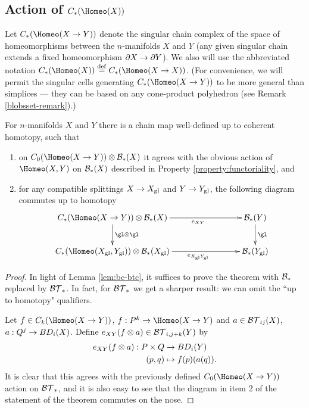 \subsection{Action of \texorpdfstring{$\CH{X}$}{C*(Homeo(M))}}
\label{ss:emap-def}

Let  $C_*(\Homeo(X \to Y))$ denote the singular chain complex of
the space of homeomorphisms
between the $n$-manifolds $X$ and $Y$ 
(any given singular chain extends a fixed homeomorphism $\partial X \to \partial Y$).
We also will use the abbreviated notation $\CH{X} \deq \CH{X \to X}$.
(For convenience, we will permit the singular cells generating $\CH{X \to Y}$ to be more general
than simplices --- they can be based on any cone-product polyhedron (see Remark \ref{blobsset-remark}).)

\begin{thm}  \label{thm:CH} \label{thm:evaluation}%
For $n$-manifolds $X$ and $Y$ there is a chain map
well-defined up to coherent homotopy,
such that
\begin{enumerate}
\item on $C_0(\Homeo(X \to Y)) \otimes \bc_*(X)$ it agrees with the obvious action of 
$\Homeo(X, Y)$ on ${\mathcal B}_*(X)$  described in Property \ref{property:functoriality}, and
\item for any compatible splittings $X\to X_\mathrm{gl}$ and $Y\to Y_\mathrm{gl}$, 
the following diagram commutes up to homotopy
\begin{equation*}
\xymatrix@C+2cm{
      \CH{X \to Y} \otimes \bc_*(X)
        \ar[r]_(.6){e_{XY}}  \ar[d]^{\gl \otimes \gl}   &
            \bc_*(Y)\ar[d]^{\gl} \\
     \CH{X\sgl, Y\sgl} \otimes \bc_*(X\sgl) \ar[r]_(.6){e_{X\sgl Y\sgl}}   & 	\bc_*(Y\sgl)  
}
\end{equation*}
\end{enumerate}
\end{thm}

\begin{proof}
In light of Lemma \ref{lem:bc-btc}, it suffices to prove the theorem with 
${\mathcal B}_*$ replaced by ${\mathcal{BT}}_*$.
In fact, for ${\mathcal{BT}}_*$ we get a sharper result: we can omit
the ``up to homotopy" qualifiers.

Let $f\in C_k(\Homeo(X \to Y))$, $f:P^k\to \Homeo(X \to Y)$ and $a\in {\mathcal{BT}}_{ij}(X)$, 
$a:Q^j \to BD_i(X)$.
Define $e_{XY}(f\otimes a)\in {\mathcal{BT}}_{i,j+k}(Y)$ by
\begin{align*}
	e_{XY}(f\otimes a) : P\times Q &\to BD_i(Y) \\
	(p,q) &\mapsto f(p)(a(q))  .
\end{align*}
It is clear that this agrees with the previously defined $C_0(\Homeo(X \to Y))$ action on ${\mathcal{BT}}_*$,
and it is also easy to see that the diagram in item 2 of the statement of the theorem
commutes on the nose.
\end{proof}


